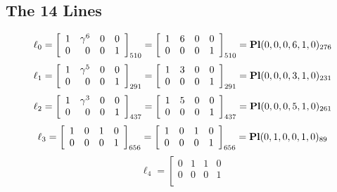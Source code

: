 \documentclass{article}
\begin{document}
{\subsection*{The 14 Lines}
$$
\ell_{0} = 
\left[
\begin{array}{*{4}{r}}
1 & \gamma^{6} & 0 & 0\\
0 & 0 & 0 & 1\\
\end{array}
\right]
_{510}
=
\left[
\begin{array}{*{4}c}
1  & 6  & 0  & 0\\
0  & 0  & 0  & 1\\
\end{array}
\right]_{510}
={\rm\bf Pl}(0,0,0,6,1,0 )_{276}$$
$$
\ell_{1} = 
\left[
\begin{array}{*{4}{r}}
1 & \gamma^{5} & 0 & 0\\
0 & 0 & 0 & 1\\
\end{array}
\right]
_{291}
=
\left[
\begin{array}{*{4}c}
1  & 3  & 0  & 0\\
0  & 0  & 0  & 1\\
\end{array}
\right]_{291}
={\rm\bf Pl}(0,0,0,3,1,0 )_{231}$$
$$
\ell_{2} = 
\left[
\begin{array}{*{4}{r}}
1 & \gamma^{3} & 0 & 0\\
0 & 0 & 0 & 1\\
\end{array}
\right]
_{437}
=
\left[
\begin{array}{*{4}c}
1  & 5  & 0  & 0\\
0  & 0  & 0  & 1\\
\end{array}
\right]_{437}
={\rm\bf Pl}(0,0,0,5,1,0 )_{261}$$
$$
\ell_{3} = 
\left[
\begin{array}{*{4}{r}}
1 & 0 & 1 & 0\\
0 & 0 & 0 & 1\\
\end{array}
\right]
_{656}
=
\left[
\begin{array}{*{4}c}
1  & 0  & 1  & 0\\
0  & 0  & 0  & 1\\
\end{array}
\right]_{656}
={\rm\bf Pl}(0,1,0,0,1,0 )_{89}$$
$$
\ell_{4} = 
\left[
\begin{array}{*{4}{r}}
0 & 1 & 1 & 0\\
0 & 0 & 0 & 1\\

\end{array}$$}
\end{document}
